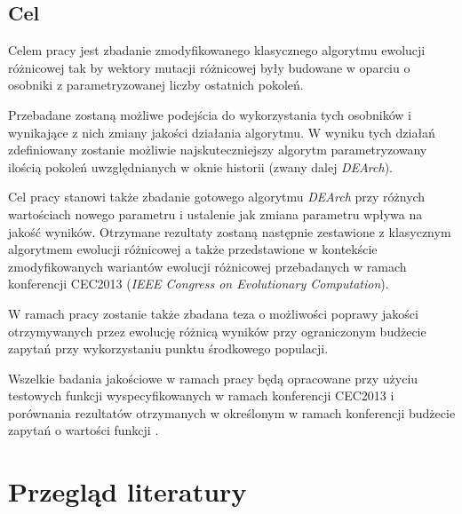 \documentclass[12pt,a4paper]{report}
\begin{document}
{\section{Cel}
\par{
Celem pracy jest zbadanie zmodyfikowanego klasycznego algorytmu ewolucji różnicowej tak by wektory mutacji różnicowej były budowane w oparciu o osobniki z parametryzowanej liczby ostatnich pokoleń.
}
\par{
Przebadane zostaną możliwe podejścia do wykorzystania tych osobników i wynikające z nich zmiany jakości działania algorytmu. W wyniku tych działań zdefiniowany zostanie możliwie najskuteczniejszy algorytm parametryzowany ilością pokoleń uwzględnianych w oknie historii (zwany dalej \emph{DEArch}).
}
\par{
Cel pracy stanowi także zbadanie gotowego algorytmu \emph{DEArch} przy różnych wartościach nowego parametru i ustalenie jak zmiana parametru wpływa na jakość wyników. Otrzymane rezultaty zostaną następnie zestawione z klasycznym algorytmem ewolucji różnicowej a także przedstawione w kontekście zmodyfikowanych wariantów ewolucji różnicowej przebadanych w ramach konferencji CEC2013 (\emph{IEEE Congress on Evolutionary Computation}).
}
\par{
W ramach pracy zostanie także zbadana teza o możliwości poprawy jakości otrzymywanych przez ewolucję różnicą wyników przy ograniczonym budżecie zapytań przy wykorzystaniu punktu środkowego populacji.
}
\par{
Wszelkie badania jakościowe w ramach pracy będą opracowane przy użyciu testowych funkcji wyspecyfikowanych w ramach konferencji CEC2013 i porównania rezultatów otrzymanych w określonym w ramach konferencji budżecie zapytań o wartości funkcji \cite{Li13benchmarkfunctions}.
}




\chapter{Przegląd literatury}
}
\end{document}
